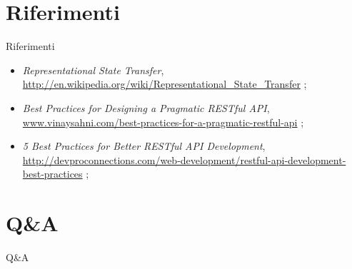 \documentclass{beamer}
\begin{document}
\section{Riferimenti}
\begin{frame}{Riferimenti}
\begin{itemize}
\item \emph{Representational State Transfer}, \url{http://en.wikipedia.org/wiki/Representational\_State\_Transfer} ;
\item \emph{Best Practices for Designing a Pragmatic RESTful API}, \url{www.vinaysahni.com/best-practices-for-a-pragmatic-restful-api} ;
\item \emph{5 Best Practices for Better RESTful API Development}, \url{http://devproconnections.com/web-development/restful-api-development-best-practices} ;
\end{itemize}
\end{frame}

\section{Q\&A}
\begin{frame}{Q\&A}
\end{frame}
\end{document}
